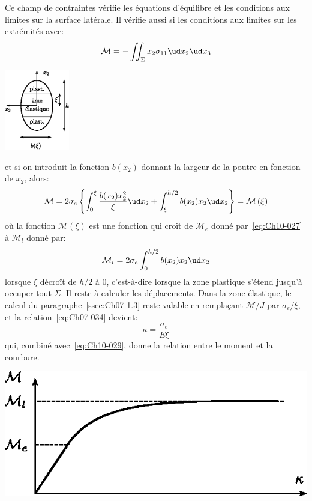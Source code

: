 \begin{multicols}{2}
    Ce champ de contraintes vérifie les équations d'équilibre et les conditions aux limites sur la surface latérale.
    Il vérifie aussi si les conditions aux limites sur les extrémités avec:
    \[
    \mathcal{M} = - \iint_{\Sigma} x_2 \sigma_{11} \ud x_2 \ud x_3
    \]
    \columnbreak
    \begin{center}
        \includegraphics[height=3.5cm]{../images/T1_Ch10-12}
    \end{center}
\end{multicols}
\noindent et si on introduit la fonction $b\left( x_2 \right)$ donnant la largeur de la poutre en fonction de $x_2$, alors:
\begin{equation}
    \mathcal{M} = 2 \sigma_e \left\{ \int_0^{\xi} \frac{b(x_2)x_2^2}{\xi} \ud x_2 + \int_{\xi}^{h/2} b(x_2)x_2 \ud x_2 \right\} = \mathcal{M} \left( \xi \right)
    \label{eq:Ch10-029}
\end{equation}
où la fonction $\mathcal{M}(\xi)$ est une fonction qui croît de $\mathcal{M}_e$ donné par~\eqref{eq:Ch10-027} à $\mathcal{M}_l$ donné par: 
\begin{equation}
    \mathcal{M}_l = 2 \sigma_e \int_0^{h/2} b(x_2) x_2 \ud x_2
    \label{eq:Ch10-030}
\end{equation}
lorsque $\xi$ décroît de $h/2$ à $0$, c'est-à-dire lorsque la zone plastique s'étend jusqu'à occuper tout $\Sigma$.
Il reste à calculer les déplacements.
Dans la zone élastique, le calcul du paragraphe~\ref{ssec:Ch07-1.3} reste valable en remplaçant $\mathcal{M}/J$ par $\sigma_e/\xi$, et la relation~\eqref{eq:Ch07-034} devient: 
\begin{equation}
    \kappa = \frac{\sigma_e}{E \xi}
    \label{eq:Ch10-031}
\end{equation}
qui, combiné avec~\eqref{eq:Ch10-029}, donne la relation entre le moment et la courbure. 

\begin{center}
    \includegraphics{../images/T1_Ch10-13}
\end{center}

